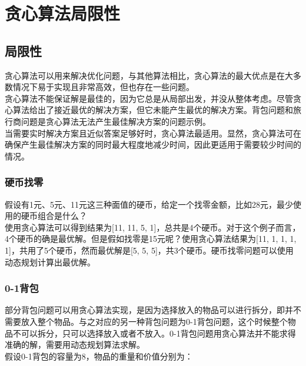 \newpage

\section{贪心算法局限性}

\subsection{局限性}

贪心算法可以用来解决优化问题，与其他算法相比，贪心算法的最大优点是在大多数情况下易于实现且非常高效，但也存在一些问题。\\

贪心算法不能保证解是最佳的，因为它总是从局部出发，并没从整体考虑。尽管贪心算法给出了接近最优的解决方案，但它未能产生最优的解决方案。背包问题和旅行商问题是贪心算法无法产生最佳解决方案的问题示例。\\

当需要实时解决方案且近似答案足够好时，贪心算法最适用。显然，贪心算法可在确保产生最佳解决方案的同时最大程度地减少时间，因此更适用于需要较少时间的情况。\\

\subsubsection{硬币找零}

假设有1元、5元、11元这三种面值的硬币，给定一个找零金额，比如28元，最少使用的硬币组合是什么？\\

使用贪心算法可以得到结果为[11, 11, 5, 1]，总共是4个硬币。对于这个例子而言，4个硬币的确是最优解。但是假如找零是15元呢？使用贪心算法结果为[11, 1, 1, 1, 1]，共用了5个硬币，然而最优解是[5, 5, 5]，共3个硬币。硬币找零问题可以使用动态规划计算出最优解。\\

\subsubsection{0-1背包}

部分背包问题可以用贪心算法实现，是因为选择放入的物品可以进行拆分，即并不需要放入整个物品。与之对应的另一种背包问题为0-1背包问题，这个时候整个物品不可以拆分，只可以选择放入或者不放入。0-1背包问题用贪心算法并不能求得准确的解，需要用动态规划算法求解。\\

假设0-1背包的容量为8，物品的重量和价值分别为：

